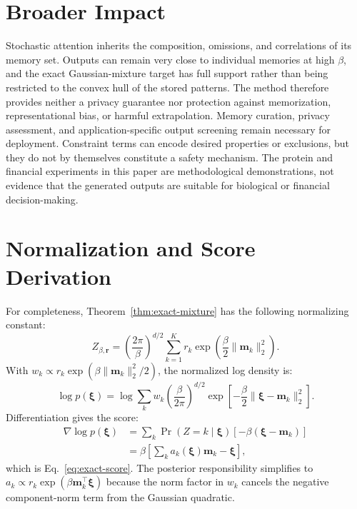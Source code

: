 \section{Broader Impact}
\label{app:broader-impact}

Stochastic attention inherits the composition, omissions, and correlations of
its memory set. Outputs can remain very close to individual memories at high
$\beta$, and the exact Gaussian-mixture target has full support rather than
being restricted to the convex hull of the stored patterns. The method
therefore provides neither a privacy guarantee nor protection against
memorization, representational bias, or harmful extrapolation. Memory curation,
privacy assessment, and application-specific output screening remain necessary
for deployment. Constraint terms can encode desired properties or exclusions,
but they do not by themselves constitute a safety mechanism. The protein and
financial experiments in this paper are methodological demonstrations, not
evidence that the generated outputs are suitable for biological or financial
decision-making.

\section{Normalization and Score Derivation}
\label{app:normalization}

For completeness, Theorem~\ref{thm:exact-mixture} has the following
normalizing constant:
\begin{equation}
Z_{\beta,\mathbf r}
=\left(\frac{2\pi}{\beta}\right)^{d/2}
\sum_{k=1}^K r_k
\exp\!\left(\frac\beta2\lVert\mathbf m_k\rVert_2^2\right).
\end{equation}
With $w_k\propto r_k\exp(\beta\lVert\mathbf m_k\rVert_2^2/2)$, the normalized
log density is:
\begin{equation}
\log p(\boldsymbol\xi)
=\log\sum_k w_k
\left(\frac\beta{2\pi}\right)^{d/2}
\exp\!\left[-\frac\beta2
\lVert\boldsymbol\xi-\mathbf m_k\rVert_2^2\right].
\end{equation}
Differentiation gives the score:
\begin{align}
\nabla\log p(\boldsymbol\xi)
&=\sum_k \Pr(Z=k\mid\boldsymbol\xi)
[-\beta(\boldsymbol\xi-\mathbf m_k)]\\
&=\beta\left[\sum_k a_k(\boldsymbol\xi)\mathbf m_k
-\boldsymbol\xi\right],
\end{align}
which is Eq.~\eqref{eq:exact-score}. The posterior responsibility simplifies to
$a_k\propto r_k\exp(\beta\mathbf m_k^\top\boldsymbol\xi)$ because the norm
factor in $w_k$ cancels the negative component-norm term from the Gaussian
quadratic.

